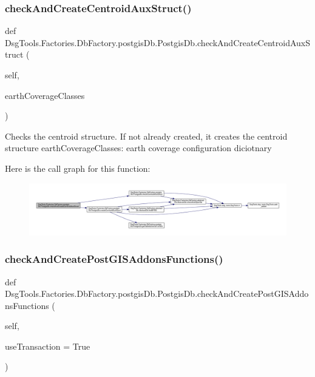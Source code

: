 \subsubsection{\texorpdfstring{check\+And\+Create\+Centroid\+Aux\+Struct()}{checkAndCreateCentroidAuxStruct()}}
{\footnotesize\ttfamily def Dsg\+Tools.\+Factories.\+Db\+Factory.\+postgis\+Db.\+Postgis\+Db.\+check\+And\+Create\+Centroid\+Aux\+Struct (\begin{DoxyParamCaption}\item[{}]{self,  }\item[{}]{earth\+Coverage\+Classes }\end{DoxyParamCaption})}

\begin{DoxyVerb}Checks the centroid structure. If not already created, it creates the centroid structure
earthCoverageClasses: earth coverage configuration diciotnary
\end{DoxyVerb}
 Here is the call graph for this function\+:
\nopagebreak
\begin{figure}[H]
\begin{center}
\leavevmode
\includegraphics[width=350pt]{class_dsg_tools_1_1_factories_1_1_db_factory_1_1postgis_db_1_1_postgis_db_ac253585db10658abbdb39adb0537d4d7_cgraph}
\end{center}
\end{figure}
\mbox{\label{class_dsg_tools_1_1_factories_1_1_db_factory_1_1postgis_db_1_1_postgis_db_abf29f610d79818e71520eaa4d85b47bb}} 
\subsubsection{\texorpdfstring{check\+And\+Create\+Post\+G\+I\+S\+Addons\+Functions()}{checkAndCreatePostGISAddonsFunctions()}}
{\footnotesize\ttfamily def Dsg\+Tools.\+Factories.\+Db\+Factory.\+postgis\+Db.\+Postgis\+Db.\+check\+And\+Create\+Post\+G\+I\+S\+Addons\+Functions (\begin{DoxyParamCaption}\item[{}]{self,  }\item[{}]{use\+Transaction = {\ttfamily True} }\end{DoxyParamCaption})}

